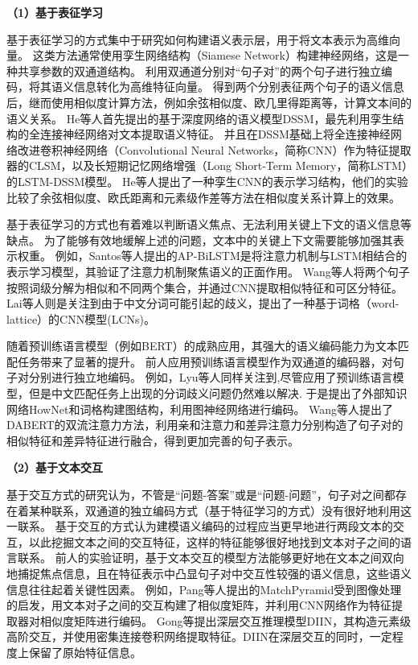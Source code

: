 \textbf{\songti （1）基于表征学习}

基于表征学习的方式集中于研究如何构建语义表示层，用于将文本表示为高维向量。
这类方法通常使用孪生网络结构（Siamese Network）构建神经网络，这是一种共享参数的双通道结构。
利用双通道分别对“句子对”的两个句子进行独立编码，将其语义信息转化为高维特征向量。
得到两个分别表征两个句子的语义信息后，继而使用相似度计算方法，例如余弦相似度、欧几里得距离等，计算文本间的语义关系。
He等人首先提出的基于深度网络的语义模型DSSM\cite{huang2013learning}，最先利用孪生结构的全连接神经网络对文本提取语义特征。
并且在DSSM基础上将全连接神经网络改进卷积神经网络（Convolutional Neural Networks，简称CNN）作为特征提取器的CLSM\cite{shen2014latent}，以及长短期记忆网络增强（Long Short-Term Memory，简称LSTM）的LSTM-DSSM\cite{palangi2014semantic}模型。
He等人提出了一种孪生CNN的表示学习结构\cite{he2015multi}，他们的实验比较了余弦相似度、欧氏距离和元素级作差等方法在相似度关系计算上的效果。

基于表征学习的方式也有着难以判断语义焦点、无法利用关键上下文的语义信息等缺点。
为了能够有效地缓解上述的问题，文本中的关键上下文需要能够加强其表示权重。
例如，Santos等人提出的AP-BiLSTM\cite{santos2016attentive}是将注意力机制与LSTM相结合的表示学习模型，其验证了注意力机制聚焦语义的正面作用。
Wang等人\cite{wang2016sentence}将两个句子按照词级分解为相似和不同两个集合，并通过CNN提取相似特征和可区分特征。 
Lai等人则是关注到由于中文分词可能引起的歧义，提出了一种基于词格（word-lattice）的CNN模型(LCNs)\cite{lai2019lattice}。

随着预训练语言模型（例如BERT\cite{devlin2018bert}）的成熟应用，其强大的语义编码能力为文本匹配任务带来了显著的提升。
前人应用预训练语言模型作为双通道的编码器，对句子对分别进行独立地编码。
例如，Lyu等人\cite{lyu2021let}同样关注到,尽管应用了预训练语言模型，但是中文匹配任务上出现的分词歧义问题仍然难以解决.
于是提出了外部知识网络HowNet\cite{dong2003hownet}和词格构建图结构，利用图神经网络进行编码。
Wang等人提出了DABERT\cite{wang-etal-2022-dabert}的双流注意力方法，利用亲和注意力和差异注意力分别构造了句子对的相似特征和差异特征进行融合，得到更加完善的句子表示。


\textbf{\songti （2）基于文本交互}
 
基于交互方式的研究认为，不管是“问题-答案”或是“问题-问题”，句子对之间都存在着某种联系，双通道的独立编码方式（基于特征学习的方式）没有很好地利用这一联系。
基于交互的方式认为建模语义编码的过程应当更早地进行两段文本的交互，以此挖掘文本之间的交互特征，这样的特征能够很好地找到文本对子之间的语言联系。
前人的实验证明，基于文本交互的模型方法能够更好地在文本之间双向地捕捉焦点信息，且在特征表示中凸显句子对中交互性较强的语义信息，这些语义信息往往起着关键性因素。
例如，Pang等人提出的MatchPyramid\cite{pang2016text}受到图像处理的启发，用文本对子之间的交互构建了相似度矩阵，并利用CNN网络作为特征提取器对相似度矩阵进行编码。
Gong等提出深层交互推理模型DIIN\cite{gong2017natural}，其构造元素级高阶交互，并使用密集连接卷积网络提取特征。DIIN在深层交互的同时，一定程度上保留了原始特征信息。

